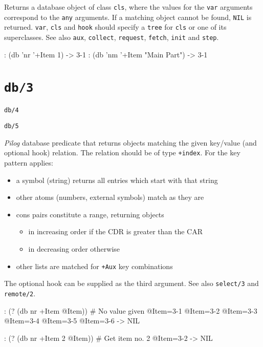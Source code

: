 {Returns a database object of class \texttt{cls}, where the values for the \texttt{var}
arguments correspond to the \texttt{any} arguments. If a matching object cannot
be found, \texttt{NIL} is returned. \texttt{var}, \texttt{cls} and \texttt{hook} should specify a
\texttt{tree} for \texttt{cls} or one of its superclasses. See also \texttt{aux}, \texttt{collect},
\texttt{request}, \texttt{fetch}, \texttt{init} and \texttt{step}.


\begin{wideverbatim}
: (db 'nr '+Item 1)
-> {3-1}
: (db 'nm '+Item "Main Part")
-> {3-1}
\end{wideverbatim}

 
\section*{\texttt{db/3}}
\label{sec:func-ref-D-db/3}


\texttt{db/4}

\texttt{db/5}

\emph{Pilog} database predicate that returns objects
matching the given key/value (and optional hook) relation. The relation
should be of type \texttt{+index}. For the key pattern applies:

\begin{itemize}
\item a symbol (string) returns all entries which start with that string
\item other atoms (numbers, external symbols) match as they are
\item cons pairs constitute a range, returning objects
\begin{itemize}
\item in increasing order if the CDR is greater than the CAR
\item in decreasing order otherwise
\end{itemize}
\item other lists are matched for \texttt{+Aux} key combinations
\end{itemize}

The optional hook can be supplied as the third argument. See also
\texttt{select/3} and \texttt{remote/2}.


\begin{wideverbatim}
: (? (db nr +Item @Item))              # No value given
 @Item={3-1}
 @Item={3-2}
 @Item={3-3}
 @Item={3-4}
 @Item={3-5}
 @Item={3-6}
-> NIL

: (? (db nr +Item 2 @Item))            # Get item no. 2
 @Item={3-2}
-> NIL


\end{wideverbatim}}
